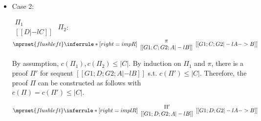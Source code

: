 \begin{itemize}
\item Case 2:
      \begin{center}
        \scriptsize
        \begin{math}
          \begin{array}{c}
            \Pi_1 \\
            {[[D |-l C]]}
          \end{array}
        \end{math}
        \qquad\qquad
        $\Pi_2$:
        \begin{math}
          $$\mprset{flushleft}
          \inferrule* [right={\tiny impR}] {
            {
              \begin{array}{c}
                \pi \\
                {[[G1; C; G2; A |-l B]]}
              \end{array}
            }
          }{[[G1; C; G2 |-l A -> B]]}
        \end{math}
      \end{center}
      By assumption, $c(\Pi_1),c(\Pi_2)\leq |C|$. By induction on $\Pi_1$
      and $\pi$, there is a proof $\Pi'$ for sequent
      $[[G1; D; G2; A |-l B]]$ s.t. $c(\Pi') \leq |C|$. Therefore, the
      proof $\Pi$ can be constructed as follows with \\
      $c(\Pi) = c(\Pi') \leq |C|$.
      \begin{center}
        \scriptsize
        \begin{math}
          $$\mprset{flushleft}
          \inferrule* [right={\tiny implR}] {
            {
              \begin{array}{c}
                \Pi' \\
                {[[G1; D; G2; A |-l B]]}
              \end{array}
            }
          }{[[G1; D; G2 |-l A -> B]]}
        \end{math}
      \end{center}
\end{itemize}





